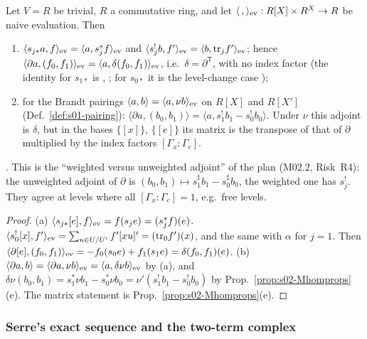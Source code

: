 \begin{proposition}\label{prop:s02-duality}
Let $V=R$ be trivial, $R$ a commutative ring, and let $\langle\,,\rangle_{\rm ev}:R[X]\times R^X\to R$ be naive evaluation. Then
\begin{enumerate}[label=(\alph*)]
\item $\langle s_{j*}a,f\rangle_{\rm ev}=\langle a,s_j^*f\rangle_{\rm ev}$ and $\langle s_j^!b,f'\rangle_{\rm ev}=\langle b,\mathrm{tr}_jf'\rangle_{\rm ev}$; hence
  $\langle\partial a,(f_0,f_1)\rangle_{\rm ev}=\langle a,\delta(f_0,f_1)\rangle_{\rm ev}$, i.e.\ $\delta=\partial^{\mathsf T}$, with no index factor
(the identity for $s_{1*}$ is , \stformal; for $s_{0*}$ it is the level-change case
);
\item for the Brandt pairings $\langle a,b\rangle=\langle a,\nu b\rangle_{\rm ev}$ on $R[X]$ and $R[X']$ (Def.~\ref{def:s01-pairing}):
  $\langle\partial a,(b_0,b_1)\rangle=\langle a,s_1^!b_1-s_0^!b_0\rangle$. Under $\nu$ this adjoint is $\delta$, but in the bases $\{[x]\}$, $\{[e]\}$ its matrix is
  the transpose of that of $\partial$ multiplied by the index factors $[\Gamma_x:\Gamma_e]$.
\end{enumerate}
\end{proposition}
\noindent\stproved. This is the ``weighted versus unweighted adjoint'' of the plan (M02.2, Risk~R4): the unweighted adjoint of
$\partial$ is $(b_0,b_1)\mapsto s_1^\sharp b_1-s_0^\sharp b_0$, the weighted one has $s_j^!$. They agree at levels where all
$[\Gamma_x:\Gamma_e]=1$, e.g.\ free levels.
\begin{proof}
(a) $\langle s_{j*}[e],f\rangle_{\rm ev}=f(s_je)=(s_j^*f)(e)$. $\langle s_0^![x],f'\rangle_{\rm ev}=\sum_{u\in U/U'}f'[xu]'=(\mathrm{tr}_0f')(x)$, and the same with $\alpha$ for
$j=1$. Then $\langle\partial[e],(f_0,f_1)\rangle_{\rm ev}=-f_0(s_0e)+f_1(s_1e)=\delta(f_0,f_1)(e)$. (b) $\langle\partial a,b\rangle=\langle\partial a,\nu b\rangle_{\rm ev}
=\langle a,\delta\nu b\rangle_{\rm ev}$ by (a), and $\delta\nu(b_0,b_1)=s_1^*\nu b_1-s_0^*\nu b_0=\nu'(s_1^!b_1-s_0^!b_0)$ by Prop.~\ref{prop:s02-Mhomprops}(e). The
matrix statement is Prop.~\ref{prop:s02-Mhomprops}(e).
\end{proof}

\subsubsection*{Serre's exact sequence and the two-term complex}

